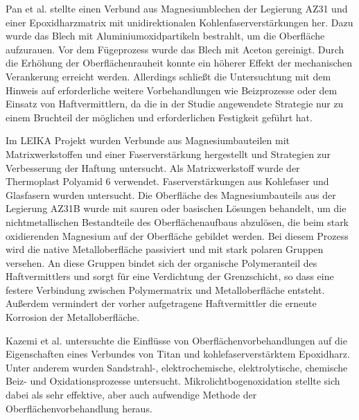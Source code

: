 Pan et al. \cite{Pan.2016} stellte einen Verbund aus Magnesiumblechen der Legierung AZ31 und einer Epoxidharzmatrix mit unidirektionalen Kohlenfaserverstärkungen her. Dazu wurde das Blech mit Aluminiumoxidpartikeln bestrahlt, um die Oberfläche aufzurauen. Vor dem Fügeprozess wurde das Blech mit Aceton gereinigt. Durch die Erhöhung der  Oberflächenrauheit konnte ein höherer Effekt der mechanischen Verankerung erreicht werden. Allerdings schließt die Untersuchtung mit dem Hinweis auf erforderliche weitere Vorbehandlungen wie Beizprozesse oder dem Einsatz von Haftvermittlern, da die in der Studie angewendete Strategie nur zu einem Bruchteil der möglichen und erforderlichen Festigkeit geführt hat. 

Im LEIKA Projekt \cite{LEIKA.2017} wurden Verbunde aus Magnesiumbauteilen mit Matrixwerkstoffen und einer Faserverstärkung hergestellt und Strategien zur Verbesserung der Haftung untersucht. Als Matrixwerkstoff wurde der Thermoplast Polyamid 6 verwendet. Faserverstärkungen aus Kohlefaser und Glasfasern wurden untersucht. Die Oberfläche des Magnesiumbauteils aus der Legierung AZ31B wurde mit sauren oder basischen Lösungen behandelt, um die nichtmetallischen Bestandteile des Oberflächenaufbaus abzulösen, die beim stark oxidierenden Magnesium auf der Oberfläche gebildet werden. 
Bei diesem Prozess wird die native Metalloberfläche passiviert und mit stark polaren Gruppen versehen. An diese Gruppen bindet sich der organische Polymeranteil des Haftvermittlers und sorgt für eine Verdichtung der Grenzschicht, so dass eine festere Verbindung zwischen Polymermatrix und Metalloberfläche entsteht. Außerdem vermindert der vorher aufgetragene Haftvermittler die erneute Korrosion der Metalloberfläche.

Kazemi et al. \cite{Kazemi.2020} untersuchte die Einflüsse von Oberflächenvorbehandlungen auf die Eigenschaften eines Verbundes von Titan und kohlefaserverstärktem Epoxidharz. Unter anderem wurden Sandstrahl-, elektrochemische, elektrolytische, chemische Beiz- und Oxidationsprozesse untersucht. Mikrolichtbogenoxidation stellte sich dabei als sehr effektive, aber auch aufwendige Methode der Oberflächenvorbehandlung heraus. 

